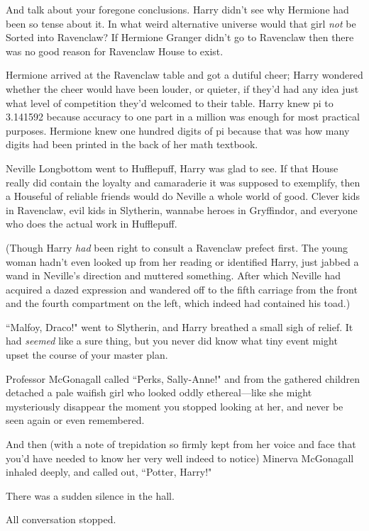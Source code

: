 And talk about your foregone conclusions. Harry didn't see why Hermione had been so tense about it. In what weird alternative universe would that girl \emph{not} be Sorted into Ravenclaw? If Hermione Granger didn't go to Ravenclaw then there was no good reason for Ravenclaw House to exist.

Hermione arrived at the Ravenclaw table and got a dutiful cheer; Harry wondered whether the cheer would have been louder, or quieter, if they'd had any idea just what level of competition they'd welcomed to their table. Harry knew pi to 3.141592 because accuracy to one part in a million was enough for most practical purposes. Hermione knew one hundred digits of pi because that was how many digits had been printed in the back of her math textbook.

Neville Longbottom went to Hufflepuff, Harry was glad to see. If that House really did contain the loyalty and camaraderie it was supposed to exemplify, then a Houseful of reliable friends would do Neville a whole world of good. Clever kids in Ravenclaw, evil kids in Slytherin, wannabe heroes in Gryffindor, and everyone who does the actual work in Hufflepuff.

(Though Harry \emph{had} been right to consult a Ravenclaw prefect first. The young woman hadn't even looked up from her reading or identified Harry, just jabbed a wand in Neville's direction and muttered something. After which Neville had acquired a dazed expression and wandered off to the fifth carriage from the front and the fourth compartment on the left, which indeed had contained his toad.)

``Malfoy, Draco!" went to Slytherin, and Harry breathed a small sigh of relief. It had \emph{seemed} like a sure thing, but you never did know what tiny event might upset the course of your master plan.

Professor McGonagall called ``Perks, Sally-Anne!" and from the gathered children detached a pale waifish girl who looked oddly ethereal—like she might mysteriously disappear the moment you stopped looking at her, and never be seen again or even remembered.

And then (with a note of trepidation so firmly kept from her voice and face that you'd have needed to know her very well indeed to notice) Minerva McGonagall inhaled deeply, and called out, ``Potter, Harry!"

There was a sudden silence in the hall.

All conversation stopped.

